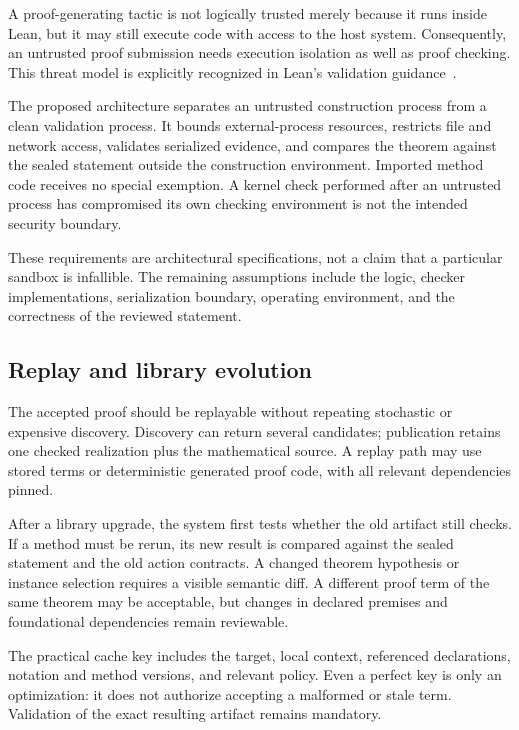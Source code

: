 \documentclass[11pt,a4paper]{article}
\theoremstyle{remark}
\begin{document}
A proof-generating tactic is not logically trusted merely because it runs inside Lean, but it may still execute code with access to the host system. Consequently, an untrusted proof submission needs execution isolation as well as proof checking. This threat model is explicitly recognized in Lean's validation guidance~\cite{lean-validation}.

The proposed architecture separates an untrusted construction process from a clean validation process. It bounds external-process resources, restricts file and network access, validates serialized evidence, and compares the theorem against the sealed statement outside the construction environment. Imported method code receives no special exemption. A kernel check performed after an untrusted process has compromised its own checking environment is not the intended security boundary.

These requirements are architectural specifications, not a claim that a particular sandbox is infallible. The remaining assumptions include the logic, checker implementations, serialization boundary, operating environment, and the correctness of the reviewed statement.

\subsection{Replay and library evolution}

The accepted proof should be replayable without repeating stochastic or expensive discovery. Discovery can return several candidates; publication retains one checked realization plus the mathematical source. A replay path may use stored terms or deterministic generated proof code, with all relevant dependencies pinned.

After a library upgrade, the system first tests whether the old artifact still checks. If a method must be rerun, its new result is compared against the sealed statement and the old action contracts. A changed theorem hypothesis or instance selection requires a visible semantic diff. A different proof term of the same theorem may be acceptable, but changes in declared premises and foundational dependencies remain reviewable.

The practical cache key includes the target, local context, referenced declarations, notation and method versions, and relevant policy. Even a perfect key is only an optimization: it does not authorize accepting a malformed or stale term. Validation of the exact resulting artifact remains mandatory.
\end{document}
